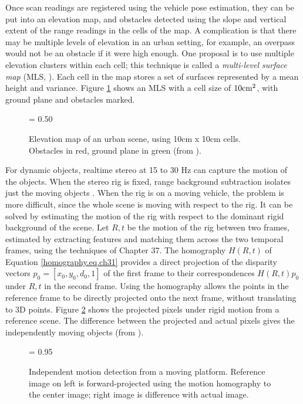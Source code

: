\documentclass[twocolumn,oneside]{book}
\begin{document}
Once scan readings are registered using the vehicle pose estimation,
they can be put into an elevation map, and obstacles detected using
the slope and vertical extent of the range readings in the cells of
the map.  A complication is that there may be multiple levels of
elevation in an urban setting, for example, an overpass would not be
an obstacle if it were high enough.  One proposal is to use multiple
elevation clusters within each cell; this technique is called a {\em
multi-level surface map } (MLS, \cite{triebel06}).
Each cell in the map stores a set of surfaces represented by a mean
height and variance.  Figure \ref{elev_map.ch31} shows an MLS with a
cell size of $10 {\rm cm}^2$, with ground plane and obstacles marked.

\begin{figure}[hbt]
{\epsfxsize = 0.50\textwidth {}}
\caption{Elevation map of an urban scene, using 10cm x 10cm cells.
Obstacles in red, ground plane in green (from \cite{triebel06}).
\label{elev_map.ch31}}
\end{figure}

For dynamic objects, realtime stereo at 15 to 30 Hz can capture the
motion of the objects.  When the stereo rig is fixed, range background
subtraction isolates just the moving objects \cite{eveland98}.  When
the rig is on a moving vehicle, the problem is more difficult, since
the whole scene is moving with respect to the rig.  It can be solved
by estimating the motion of the rig with respect to the dominant rigid
background of the scene.  Let $R,t$ be the motion of the rig between
two frames, estimated by extracting features and matching them across
the two temporal frames, using the techniques of Chapter 37.
The homography $H(R,t)$ of Equation
\ref{homography.eq.ch31} provides a direct projection of the disparity
vectors $p_0 = [x_0,y_0,d_0,1]$ of the first frame to their
correspondences $H(R,t)p_0$ under $R,t$ in the second frame.  Using
the homography allows the points in the reference frame to be directly
projected onto the next frame, without translating to 3D points.
Figure \ref{ind_motion.ch31} shows the projected pixels under rigid
motion from a reference scene.  The difference between the projected
and actual pixels gives the independently moving objects (from
\cite{agrawal05}).

\begin{figure}[ht!]
{\epsfxsize = 0.95\textwidth {}}
\caption{Independent motion detection from a moving platform.
Reference image on left is forward-projected using the motion homography to
the center image; right image is difference with actual image.
\label{ind_motion.ch31}}
\end{figure}
\end{document}
